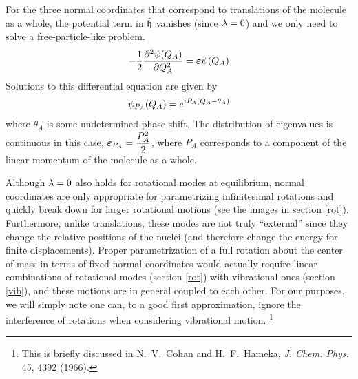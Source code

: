 \documentclass[11pt]{article}
\begin{document}
For the three normal coordinates that correspond to translations of the
molecule as a whole, the potential term in $\hat{\mathfrak{h}}$ vanishes (since
$\lambda=0$) and we only need to solve a free-particle-like problem.
\begin{align}
-\dfrac{1}{2}
     \dfrac{ \partial^{2} \psi(Q_A) }{\partial Q_A ^{2}}
=
    \bm\varepsilon
    \psi(Q_A)
\end{align}
Solutions to this differential equation are given by
\begin{align}
    \psi_{P_A}(Q_A)
=
    e^{iP_A(Q_A-\theta_A)}
\end{align}
where $\theta_A$ is some undetermined phase shift. The distribution of
eigenvalues is continuous in this case, $\bm\varepsilon_{P_A}=\dfrac{P_A^2}{2}$, where $P_A$
corresponds to a component of the linear momentum of the molecule as a whole.

Although $\lambda=0$ also holds for rotational modes at equilibrium, normal
coordinates are only appropriate for parametrizing infinitesimal rotations and
quickly break down for larger rotational motions (see the images in section
\ref{rot}). Furthermore, unlike translations, these modes are not truly
``external'' since they change the relative positions of the nuclei (and
therefore change the energy for finite displacements). Proper parametrization
of a full rotation about the center of mass in terms of fixed normal
coordinates would actually require linear combinations of rotational modes
(section \ref{rot}) with vibrational ones (section \ref{vib}), and these
motions are in general coupled to each other. For our purposes, we will simply
note one can, to a good first approximation, ignore the interference of
rotations when considering vibrational motion. \footnote{This is briefly discussed
in N.\ V.\ Cohan and H.\ F.\ Hameka, {\it J. Chem. Phys.} 45, 4392 (1966).}
\end{document}
